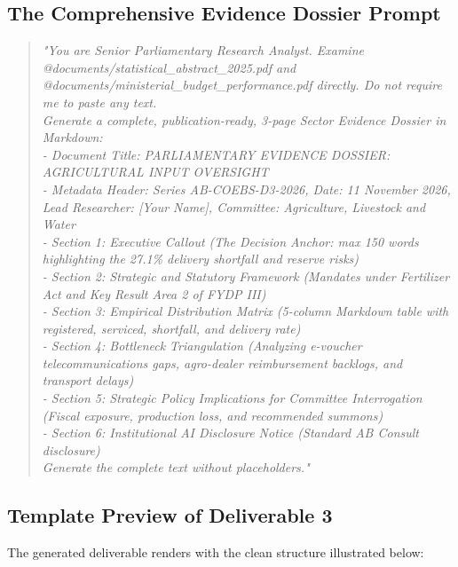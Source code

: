 \documentclass[11pt, a4paper]{report}
\begin{document}
\subsection{The Comprehensive Evidence Dossier Prompt}
\begin{quote}
\small
\textit{"You are Senior Parliamentary Research Analyst. Examine @documents/statistical\_abstract\_2025.pdf and @documents/ministerial\_budget\_performance.pdf directly. Do not require me to paste any text. \\
Generate a complete, publication-ready, 3-page Sector Evidence Dossier in Markdown: \\
- Document Title: PARLIAMENTARY EVIDENCE DOSSIER: AGRICULTURAL INPUT OVERSIGHT \\
- Metadata Header: Series AB-COEBS-D3-2026, Date: 11 November 2026, Lead Researcher: [Your Name], Committee: Agriculture, Livestock and Water \\
- Section 1: Executive Callout (The Decision Anchor: max 150 words highlighting the 27.1\% delivery shortfall and reserve risks) \\
- Section 2: Strategic and Statutory Framework (Mandates under Fertilizer Act and Key Result Area 2 of FYDP III) \\
- Section 3: Empirical Distribution Matrix (5-column Markdown table with registered, serviced, shortfall, and delivery rate) \\
- Section 4: Bottleneck Triangulation (Analyzing e-voucher telecommunications gaps, agro-dealer reimbursement backlogs, and transport delays) \\
- Section 5: Strategic Policy Implications for Committee Interrogation (Fiscal exposure, production loss, and recommended summons) \\
- Section 6: Institutional AI Disclosure Notice (Standard AB Consult disclosure) \\
Generate the complete text without placeholders."}
\end{quote}

\subsection{Template Preview of Deliverable 3}
The generated deliverable renders with the clean structure illustrated below:
\end{document}
